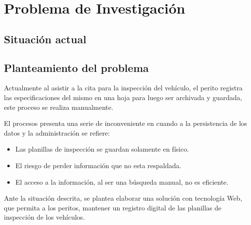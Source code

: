 \chapter{Problema de Investigación}


\section{Situación actual} 



\section{Planteamiento del problema} 
\setlength{\parskip}{5mm}


Actualmente al asistir a la cita para la inspección del vehículo, el perito registra las especificaciones del mismo en una hoja para luego ser archivada y guardada, este proceso se realiza manualmente.

El procesos presenta una serie de inconveniente en cuando a la persistencia de los datos y la administración se refiere:

\begin{itemize}

	\item Las planillas de inspección se guardan solamente en físico.

	\item El riesgo de perder información que no esta respaldada.

	\item El acceso a la información, al ser una búsqueda manual, no es eficiente. 

\end{itemize}


Ante la situación descrita, se plantea elaborar una solución con tecnología Web, que permita a los peritos, mantener un registro digital de las planillas de inspección de los vehículos.







